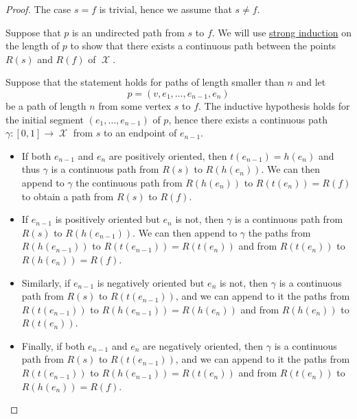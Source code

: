 \begin{proof}
  The case \( s = f \) is trivial, hence we assume that \( s \neq f \).

   Suppose that \( p \) is an undirected path from \( s \) to \( f \). We will use \hyperref[rem:induction/well_founded]{strong induction} on the length of \( p \) to show that there exists a continuous path between the points \( R(s) \) and \( R(f)  \) of \( \mscrX \).

  Suppose that the statement holds for paths of length smaller than \( n \) and let
  \begin{equation*}
    p = (v, e_1, \ldots, e_{n-1}, e_n)
  \end{equation*}
  be a path of length \( n \) from some vertex \( s \) to \( f \). The inductive hypothesis holds for the initial segment \( (e_1, \ldots, e_{n-1}) \) of \( p \), hence there exists a continuous path \( \gamma: [0, 1] \to \mscrX \) from \( s \) to an endpoint of \( e_{n-1} \).
  \begin{itemize}
    \item If both \( e_{n-1} \) and \( e_n \) are positively oriented, then \( t(e_{n-1}) = h(e_n) \) and thus \( \gamma \) is a continuous path from \( R(s)  \) to \( R(h(e_n)) \). We can then append to \( \gamma \) the continuous path from \( R(h(e_n)) \) to \( R(t(e_n)) = R(f)  \) to obtain a path from \( R(s)  \) to \( R(f)  \).

    \item If \( e_{n-1} \) is positively oriented but \( e_n \) is not, then \( \gamma \) is a continuous path from \( R(s)  \) to \( R(h(e_{n-1})) \). We can then append to \( \gamma \) the paths from \( R(h(e_{n-1})) \) to \( R(t(e_{n-1})) = R(t(e_n)) \) and from \( R(t(e_n)) \) to \( R(h(e_n)) = R(f)  \).

    \item Similarly, if \( e_{n-1} \) is negatively oriented but \( e_n \) is not, then \( \gamma \) is a continuous path from \( R(s)  \) to \( R(t(e_{n-1})) \), and we can append to it the paths from \( R(t(e_{n-1})) \) to \( R(h(e_{n-1})) = R(h(e_n)) \) and from \( R(h(e_n)) \) to \( R(t(e_n)) \).

    \item Finally, if both \( e_{n-1} \) and \( e_n \) are negatively oriented, then \( \gamma \) is a continuous path from \( R(s)  \) to \( R(t(e_{n-1})) \), and we can append to it the paths from \( R(t(e_{n-1})) \) to \( R(h(e_{n-1})) = R(t(e_n)) \) and from \( R(t(e_n)) \) to \( R(h(e_n)) = R(f)  \).
  \end{itemize}


\end{proof}
